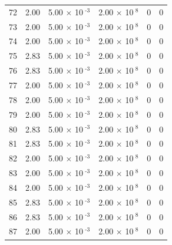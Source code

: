 \documentclass[a4paper,11pt]{article}
\begin{document}
\begin{center}
\begin{longtable}{|R{1.5cm}|R{2.4cm}|R{2.4cm}|R{2.4cm}|R{2.4cm}|R{2.4cm}|}
   72 &   2.00  &         5.00 $\times$ 10$^{\text{          -3}}$  &         2.00 $\times$ 10$^{\text{           8}}$  & 0  & 0 \\
   73 &   2.00  &         5.00 $\times$ 10$^{\text{          -3}}$  &         2.00 $\times$ 10$^{\text{           8}}$  & 0  & 0 \\
   74 &   2.00  &         5.00 $\times$ 10$^{\text{          -3}}$  &         2.00 $\times$ 10$^{\text{           8}}$  & 0  & 0 \\
   75 &   2.83  &         5.00 $\times$ 10$^{\text{          -3}}$  &         2.00 $\times$ 10$^{\text{           8}}$  & 0  & 0 \\
   76 &   2.83  &         5.00 $\times$ 10$^{\text{          -3}}$  &         2.00 $\times$ 10$^{\text{           8}}$  & 0  & 0 \\
   77 &   2.00  &         5.00 $\times$ 10$^{\text{          -3}}$  &         2.00 $\times$ 10$^{\text{           8}}$  & 0  & 0 \\
   78 &   2.00  &         5.00 $\times$ 10$^{\text{          -3}}$  &         2.00 $\times$ 10$^{\text{           8}}$  & 0  & 0 \\
   79 &   2.00  &         5.00 $\times$ 10$^{\text{          -3}}$  &         2.00 $\times$ 10$^{\text{           8}}$  & 0  & 0 \\
   80 &   2.83  &         5.00 $\times$ 10$^{\text{          -3}}$  &         2.00 $\times$ 10$^{\text{           8}}$  & 0  & 0 \\
   81 &   2.83  &         5.00 $\times$ 10$^{\text{          -3}}$  &         2.00 $\times$ 10$^{\text{           8}}$  & 0  & 0 \\
   82 &   2.00  &         5.00 $\times$ 10$^{\text{          -3}}$  &         2.00 $\times$ 10$^{\text{           8}}$  & 0  & 0 \\
   83 &   2.00  &         5.00 $\times$ 10$^{\text{          -3}}$  &         2.00 $\times$ 10$^{\text{           8}}$  & 0  & 0 \\
   84 &   2.00  &         5.00 $\times$ 10$^{\text{          -3}}$  &         2.00 $\times$ 10$^{\text{           8}}$  & 0  & 0 \\
   85 &   2.83  &         5.00 $\times$ 10$^{\text{          -3}}$  &         2.00 $\times$ 10$^{\text{           8}}$  & 0  & 0 \\
   86 &   2.83  &         5.00 $\times$ 10$^{\text{          -3}}$  &         2.00 $\times$ 10$^{\text{           8}}$  & 0  & 0 \\
   87 &   2.00  &         5.00 $\times$ 10$^{\text{          -3}}$  &         2.00 $\times$ 10$^{\text{           8}}$  & 0  & 0 \\

\end{longtable}
\end{center}
\end{document}
